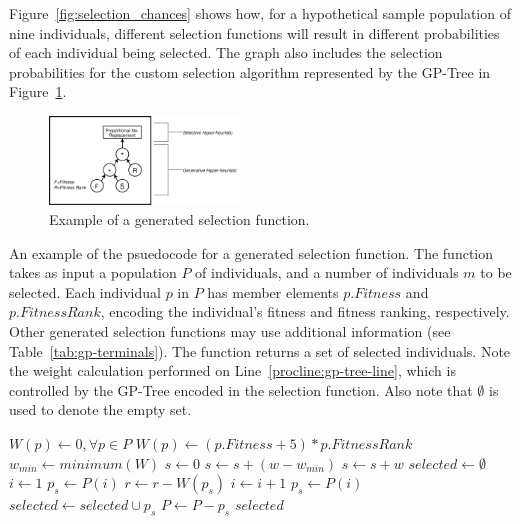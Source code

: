 \documentclass[sigconf]{acmart}
\begin{document}
Figure~\ref{fig:selection_chances} shows how, for a hypothetical sample population of nine individuals, different selection functions will result in different probabilities of each individual being selected. The graph also includes the selection probabilities for the custom selection algorithm represented by the GP-Tree in Figure~\ref{fig:example_adpsea}. 

\begin{figure}
	\centering
	\includegraphics[width=0.45\textwidth]{example_eppsea}
	\caption{Example of a generated selection function.}
	\label{fig:example_adpsea}
\end{figure}

\begin{algorithm}
	\caption{An example of the psuedocode for a generated selection function. The function takes as input a population $P$ of individuals, and a number of individuals $m$ to be selected. Each individual $p$ in $P$ has member elements $p.Fitness$ and $p.FitnessRank$, encoding the individual's fitness and fitness ranking, respectively. Other generated selection functions may use additional information (see Table~\ref{tab:gp-terminals}).  The function returns a set of selected individuals. Note the weight calculation performed on Line~\ref{procline:gp-tree-line}, which is controlled by the GP-Tree encoded in the selection function. Also note that $\emptyset$ is used to denote the empty set.}
	\label{alg:ExampleSelection}
	\begin{algorithmic}[1]
		\label{proc:ExampleSelection}
		\State $W(p) \leftarrow 0,\forall p \in P$
		\State $W(p) \leftarrow (p.Fitness + 5)*p.FitnessRank$\label{procline:gp-tree-line}
		\EndFor
		\State $w_{min} \leftarrow minimum(W)$	
		\State $s \leftarrow 0$ 
		\State $s \leftarrow s + (w - w_{min} )$			
		\Else
		\State $s \leftarrow s + w$		
		\EndIf	
		\EndFor
		\State $selected \leftarrow \emptyset$
		\State $i \leftarrow 1$
		\State $p_s \leftarrow P(i)$
		\State $r \leftarrow r - W(p_s)$
		\State $i \leftarrow i + 1$
		\State $p_s \leftarrow P(i)$
		\EndWhile	
		\State $selected \leftarrow selected \cup p_s$
		\State $P \leftarrow P - p_s$
		\EndFor
		\State \Return $selected$
		\EndFunction
	\end{algorithmic}
\end{algorithm}
\end{document}
